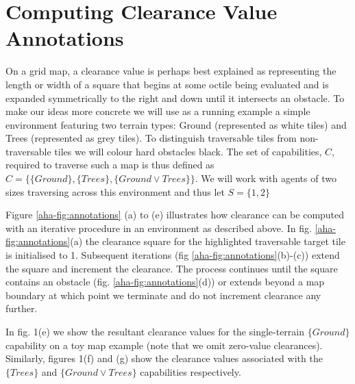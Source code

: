 \section{Computing Clearance Value Annotations}
\label{aha:planningwithannotations}
On a grid map, a clearance value is perhaps best explained as representing the length or width of a square that begins at some octile being evaluated and is expanded symmetrically to the right and down until it intersects an obstacle.     
To make our ideas more concrete we will use as a running example a simple environment featuring two terrain types: Ground (represented as white tiles) and Trees (represented as grey tiles). To distinguish traversable tiles from non-traversable tiles we will colour hard obstacles black. 
The set of capabilities, $C$, required to traverse such a map is thus defined as $C = \lbrace \lbrace Ground \rbrace, \lbrace Trees \rbrace, \lbrace Ground \vee Trees \rbrace \rbrace$. We will work with agents of two sizes traversing across this environment and thus let $S = \lbrace 1, 2 \rbrace$
\par \indent
Figure \ref{aha-fig:annotations} (a) to (e) illustrates how clearance can be computed with an iterative procedure in an environment as described above.
In fig. \ref{aha-fig:annotations}(a) the clearance square for the highlighted traversable target tile is initialised to 1. 
Subsequent iterations (fig \ref{aha-fig:annotations}(b)-(c)) extend the square and increment the clearance. 
The process continues until the square contains an obstacle (fig. \ref{aha-fig:annotations}(d)) or extends beyond a map boundary at which point we terminate and do not increment clearance any further.
\par \indent
In fig. 1(e) we show the resultant clearance values for the single-terrain $\lbrace Ground \rbrace$ capability on a toy map example (note that we omit zero-value clearances).
Similarly, figures 1(f) and (g) show the clearance values associated with the $\lbrace Trees \rbrace$ and $\lbrace Ground \vee Trees \rbrace$ capabilities respectively.  

